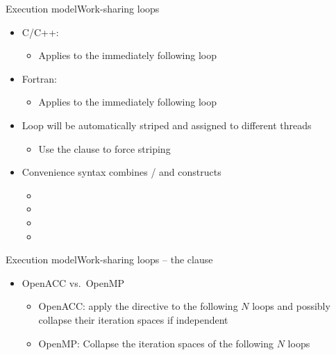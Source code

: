 \documentclass[12pt,aspectratio=169]{beamer}
\begin{document}
\begin{frame}{Execution model}{Work-sharing loops}
  \begin{itemize}
  \item C/C++: 
    \begin{itemize}
    \item Applies to the immediately following  loop
    \end{itemize}
  \item Fortran: 
    \begin{itemize}
    \item Applies to the immediately following  loop
    \end{itemize}
  \item Loop will be automatically striped and assigned to different threads
    \begin{itemize}
    \item Use the  clause to force striping
    \end{itemize}
  \item Convenience syntax combines
    / and 
    constructs
    \begin{itemize}
    \item {}
    \item {}
    \item {}
    \item {}
    \end{itemize}
  \end{itemize}
\end{frame}

\begin{frame}[fragile]{Execution model}{Work-sharing loops -- the  clause}
  \begin{itemize}
  \item OpenACC vs.\ OpenMP
    \begin{itemize}
    \item OpenACC: apply the  directive to the following $N$
      loops and possibly collapse their iteration spaces if independent
    \item OpenMP: Collapse the iteration spaces of the following $N$ loops
    \end{itemize}
  \end{itemize}
\end{frame}
\end{document}
